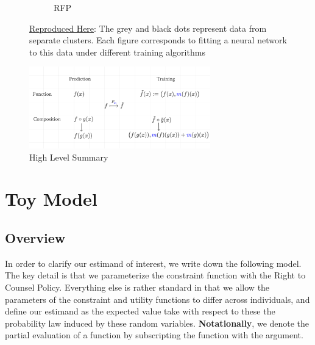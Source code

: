 \documentclass[a4paper,12pt]{article}
\begin{document}
\begin{figure}[htbp]
\begin{subfigure}{.32\textwidth}
        \caption{RFP}
    \label{fig:rfp}
\end{subfigure}
\caption{ \href{https://github.com/pharringtonp19/rfp/blob/main/notebooks/grad_desc_toy.ipynb}{Reproduced Here}: The grey and black dots represent data from separate clusters. Each figure corresponds to fitting a neural network to this data under different training algorithms}
\label{fig:mamlablation}
\end{figure}

\begin{figure}[htbp]
\centering
\includegraphics[width=0.7\textwidth]{figures/framework/cat.png}
        \caption{High Level Summary}
\end{figure}
\section{Toy Model}
\subsection{Overview}
In order to clarify our estimand of interest, we write down the following model. The key detail is that we parameterize the constraint function with the Right to Counsel Policy. Everything else is rather standard in that we allow the parameters of the constraint and utility functions to differ across individuals, and define our estimand as the expected value take with respect to these the probability law induced by these random variables. \textbf{Notationally}, we denote the partial evaluation of a function by subscripting the function with the argument.\par 
\end{document}
